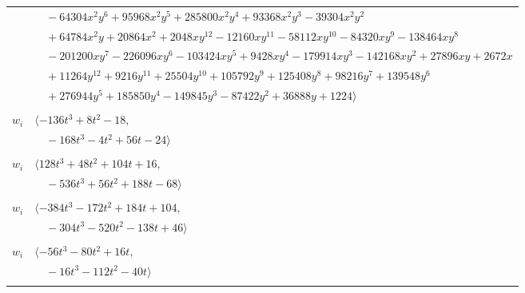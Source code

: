 \documentclass[11pt]{article}
\begin{document}
\begin{longtable}{@{}ll@{}}
 & $\quad -64304x^{2}y^{6}+95968x^{2}y^{5}+285800x^{2}y^{4}+93368x^{2}y^{3}-39304x^{2}y^{2}$\\
 & $\quad +64784x^{2}y+20864x^{2}+2048xy^{12}-12160xy^{11}-58112xy^{10}-84320xy^{9}-138464xy^{8}$\\
 & $\quad -201200xy^{7}-226096xy^{6}-103424xy^{5}+9428xy^{4}-179914xy^{3}-142168xy^{2}+27896xy+2672x$\\
 & $\quad +11264y^{12}+9216y^{11}+25504y^{10}+105792y^{9}+125408y^{8}+98216y^{7}+139548y^{6}$\\
 & $\quad +276944y^{5}+185850y^{4}-149845y^{3}-87422y^{2}+36888y+1224\rangle$\\
\addlinespace[2pt]
\multicolumn{2}{@{}p{0.97\textwidth}@{}}{$i=49$, $D_i=2$, $\rho_{ij}$: $1{:}1, \allowbreak 5{:}2, \allowbreak 19{:}2, \allowbreak 30{:}2, \allowbreak 39{:}2, \allowbreak 59{:}2, \allowbreak 61{:}1$}\\
$w_i$ & $\langle -136t^{3}+8t^{2}-18,$\\
 & $\quad -168t^{3}-4t^{2}+56t-24\rangle$\\
\addlinespace[2pt]
\multicolumn{2}{@{}p{0.97\textwidth}@{}}{$i=50$, $D_i=4$, $\rho_{ij}$: $17{:}2, \allowbreak 18{:}1, \allowbreak 22{:}1, \allowbreak 38{:}2, \allowbreak 40{:}2, \allowbreak 43{:}2, \allowbreak 44{:}2, \allowbreak 48{:}1, \allowbreak 57{:}2$}\\
$w_i$ & $\langle 128t^{3}+48t^{2}+104t+16,$\\
 & $\quad -536t^{3}+56t^{2}+188t-68\rangle$\\
\addlinespace[2pt]
\multicolumn{2}{@{}p{0.97\textwidth}@{}}{$i=51$, $D_i=4$, $\rho_{ij}$: $16{:}2, \allowbreak 24{:}1, \allowbreak 27{:}2, \allowbreak 29{:}2, \allowbreak 30{:}2, \allowbreak 40{:}1, \allowbreak 44{:}1, \allowbreak 48{:}2$}\\
$w_i$ & $\langle -384t^{3}-172t^{2}+184t+104,$\\
 & $\quad -304t^{3}-520t^{2}-138t+46\rangle$\\
\addlinespace[2pt]
\multicolumn{2}{@{}p{0.97\textwidth}@{}}{$i=52$, $D_i=2$, $\rho_{ij}$: $0{:}2, \allowbreak 18{:}2, \allowbreak 22{:}2, \allowbreak 33{:}2, \allowbreak 60{:}1$}\\
$w_i$ & $\langle -56t^{3}-80t^{2}+16t,$\\
 & $\quad -16t^{3}-112t^{2}-40t\rangle$\\
\addlinespace[2pt]
\multicolumn{2}{@{}p{0.97\textwidth}@{}}{$i=53$, $D_i=4$, $\rho_{ij}$: $2{:}2, \allowbreak 12{:}2, \allowbreak 23{:}2, \allowbreak 46{:}2, \allowbreak 55{:}1$}\\

\end{longtable}
\end{document}
